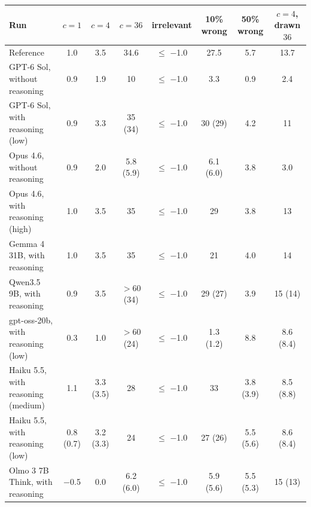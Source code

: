 \begin{tabular}{lccccccc}
\toprule
Run & $c = 1$ & $c = 4$ & $c = 36$ & irrelevant & 10\% wrong & 50\% wrong & $c = 4$, drawn $36$ \\
\midrule
Reference & 1.0 & 3.5 & 34.6 & $\leq$ $-$1.0 & 27.5 & 5.7 & 13.7 \\
GPT-6 Sol, without reasoning & 0.9 & 1.9 & 10 & $\leq$ $-$1.0 & 3.3 & 0.9 & 2.4 \\
GPT-6 Sol, with reasoning (low) & 0.9 & 3.3 & 35 (34) & $\leq$ $-$1.0 & 30 (29) & 4.2 & 11 \\
Opus 4.6, without reasoning & 0.9 & 2.0 & 5.8 (5.9) & $\leq$ $-$1.0 & 6.1 (6.0) & 3.8 & 3.0 \\
Opus 4.6, with reasoning (high) & 1.0 & 3.5 & 35 & $\leq$ $-$1.0 & 29 & 3.8 & 13 \\
Gemma 4 31B, with reasoning & 1.0 & 3.5 & 35 & $\leq$ $-$1.0 & 21 & 4.0 & 14 \\
Qwen3.5 9B, with reasoning & 0.9 & 3.5 & $> 60$ (34) & $\leq$ $-$1.0 & 29 (27) & 3.9 & 15 (14) \\
gpt-oss-20b, with reasoning (low) & 0.3 & 1.0 & $> 60$ (24) & $\leq$ $-$1.0 & 1.3 (1.2) & 8.8 & 8.6 (8.4) \\
Haiku 5.5, with reasoning (medium) & 1.1 & 3.3 (3.5) & 28 & $\leq$ $-$1.0 & 33 & 3.8 (3.9) & 8.5 (8.8) \\
Haiku 5.5, with reasoning (low) & 0.8 (0.7) & 3.2 (3.3) & 24 & $\leq$ $-$1.0 & 27 (26) & 5.5 (5.6) & 8.6 (8.4) \\
Olmo 3 7B Think, with reasoning & $-$0.5 & 0.0 & 6.2 (6.0) & $\leq$ $-$1.0 & 5.9 (5.6) & 5.5 (5.3) & 15 (13) \\
\bottomrule
\end{tabular}

